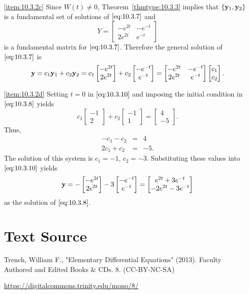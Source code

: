 \documentclass{ximera}
\begin{document}
\begin{example}
\begin{explanation}
\ref{item:10.3.2c} Since $W(t)\ne0$,
Theorem~\ref{thmtype:10.3.3} implies that $\{{\bf y}_1,{\bf y}_2\}$ is
a fundamental set of solutions  of $\eqref{eq:10.3.7}$ and
$$
Y=\begin{bmatrix}-e^{2t}&-e^{-t}\\2e^{2t}&
e^{-t}\end{bmatrix}
$$
is a fundamental matrix for $\eqref{eq:10.3.7}$.
 Therefore the general
solution of $\eqref{eq:10.3.7}$ is
\begin{equation} \label{eq:10.3.10}
{\bf y}=c_1{\bf y}_1+c_2{\bf y}_2=
c_1\begin{bmatrix} -e^{2t}\\2e^{2t}\end{bmatrix}+c_2\begin{bmatrix}-e^{-t}\\e^{-t}\end{bmatrix}
=\begin{bmatrix}-e^{2t}&-e^{-t}\\2e^{2t}&
e^{-t}\end{bmatrix}
\begin{bmatrix}c_1\\c_2\end{bmatrix}.
\end{equation}

\ref{item:10.3.2d}
Setting $t=0$ in $\eqref{eq:10.3.10}$ and imposing the initial condition
in $\eqref{eq:10.3.8}$ yields
$$
c_1\begin{bmatrix}-1 \\2\end{bmatrix}+c_2
\begin{bmatrix}-1 \\1\end{bmatrix}=
\begin{bmatrix} 4 \\-5\end{bmatrix}.
$$
Thus,
\begin{eqnarray*}
-c_1-c_2&=&4 \\
2c_1+c_2&=&-5.
\end{eqnarray*}
The solution of this system is $c_1=-1$, $c_2=-3$.  Substituting these
values into  $\eqref{eq:10.3.10}$ yields
$$
{\bf y}=-\begin{bmatrix}-e^{2t} \\ 2e^{2t}\end{bmatrix}-3
\begin{bmatrix}-e^{-t} \\ e^{-t}\end{bmatrix}=
\begin{bmatrix} e^{2t}+3e^{-t} \\-2e^{2t}-3e^{-t}
\end{bmatrix}
$$
as the solution of  $\eqref{eq:10.3.8}$.
\end{explanation}
\end{example}


\section*{Text Source}
Trench, William F., "Elementary Differential Equations" (2013). Faculty Authored and Edited Books \& CDs. 8. (CC-BY-NC-SA)

\href{https://digitalcommons.trinity.edu/mono/8/}{https://digitalcommons.trinity.edu/mono/8/}
\end{document}
